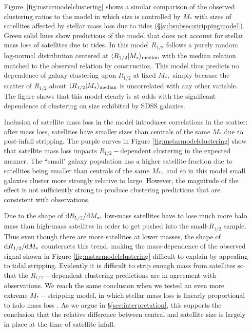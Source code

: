 \documentclass[usenatbib,usegraphicx,letterpaper]{mn2e}
\newcommand{\rhalf}{R_{1/2}}
\newcommand{\mstar}{M_{\ast}}
\newcommand{\median}[2]{\langle{#1}\vert{#2}\rangle_{\rm median}}
\begin{document}
Figure~\ref{fig:mstarmodelclustering} shows a similar comparison of the observed clustering ratios to the model
in which size is controlled by $\mstar$ with sizes of satellites affected by stellar mass loss due to tides (\S\ref{subsubsec:strippingmodel}). Green solid lines show predictions of the model that does not account for stellar
mass loss of satellites due to tides. In this model $\rhalf$ follows a purely random log-normal distribution centered at $\median{\rhalf}{\mstar}$ with the median relation matched to the observed relation by construction.  This model thus predicts no dependence of galaxy clustering upon $\rhalf$ at fixed $\mstar,$ simply because the scatter of $\rhalf$ about $\median{\rhalf}{\mstar}$ is uncorrelated with any other variable. The figure shows that this model clearly is at odds with the significant dependence of clustering on size exhibited by SDSS galaxies.

Inclusion of satellite mass loss in the model introduces correlations in the scatter: after mass loss, satellites have smaller sizes than centrals of the same $\mstar$ due to post-infall stripping.
The purple curves in Figure \ref{fig:mstarmodelclustering} show that satellite mass loss impacts $\rhalf-$dependent clustering in the expected manner. The ``small" galaxy population has a higher satellite fraction due to satellites being smaller than centrals of the same $\mstar,$ and so in this model small galaxies cluster more strongly relative to large. However, the magnitude of the effect is not sufficiently strong  to produce clustering predictions that are consistent with observations. 

Due to the shape of ${\rm d}\rhalf/{\rm d}\mstar,$ low-mass satellites have to lose much more halo mass than high-mass satellites in order to get pushed into the small-$\rhalf$ sample. Thus even though there are more satellites at lower masses, the shape of ${\rm d}\rhalf/{\rm d}\mstar$ counteracts this trend, making the mass-dependence of the observed signal shown in Figure \ref{fig:mstarmodelclustering} difficult to explain by appealing to tidal stripping. Evidently it is difficult to strip enough mass from satellites so that the $\rhalf-$dependent clustering predictions are in agreement with observations.  We reach the same conclusion when we tested an even more extreme $\mstar-$stripping model, in which stellar mass loss is linearly proportional to halo mass loss \citep[][Model 1]{watson_etal12}.
As we argue in \S\ref{sec:interpretation}, this supports the conclusion that the relative difference between central and satellite size is largely in place at the time of satellite infall.
\end{document}
